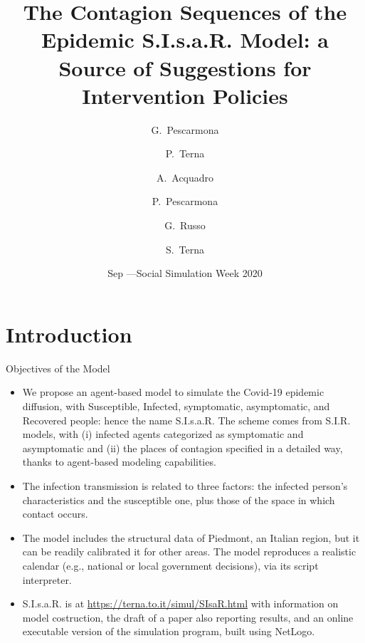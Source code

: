 \documentclass[8pt]{beamer}
\title[S.I.s.a.R. Epidemic Model] %
{The Contagion Sequences of the Epidemic S.I.s.a.R. Model: a Source of Suggestions for Intervention Policies}
\author[] %
{G.~Pescarmona\inst{1} \and P.~Terna\inst{2} \and A.~Acquadro\inst{1} \and P.~Pescarmona\inst{3} \and G.~Russo\inst{4}  
\and S.~Terna\inst{5}  }
\institute[] %
{
  \inst{1}%
 University of Torino, Italy
  \and
  \inst{2}%
  University of Torino, Italy, retired \& Collegio Carlo Alberto, Italy
 \and
  \inst{3}%
  University of Groningen, The Netherlands  
  \and
  \inst{4}%
  Centro Einaudi, Torino, Italy
  \and
  \inst{5}%
 tomorrowdata.io
  }
\date[] %
{Sep \nth{16}---Social Simulation Week 2020}
\begin{document}
\begin{frame}
  \titlepage
\end{frame}


\section{Introduction}

\begin{frame}{Objectives of the Model}

  \begin{itemize}
  \item
We propose an agent-based model to simulate the Covid-19 epidemic diffusion, with Susceptible, Infected, symptomatic, asymptomatic, and Recovered people: hence the name S.I.s.a.R. The scheme comes from S.I.R. models, with (i) infected agents categorized as symptomatic and asymptomatic and (ii) the places of contagion specified in a detailed way, thanks to agent-based modeling capabilities. 

 \item
The infection transmission is related to three factors: the infected person's characteristics and the susceptible one, plus those of the space in which contact occurs.

  \item
The model includes the structural data of Piedmont, an Italian region, but it can be readily calibrated it for other areas. The model reproduces a realistic calendar (e.g., national or local government decisions), via its script interpreter.  

\bigskip

 \item
 
S.I.s.a.R. is at \url{https://terna.to.it/simul/SIsaR.html} with information on model costruction, the draft of a paper also reporting results, and an online executable version of the simulation program, built using NetLogo.

 \end{itemize}
\end{frame}
\end{document}
